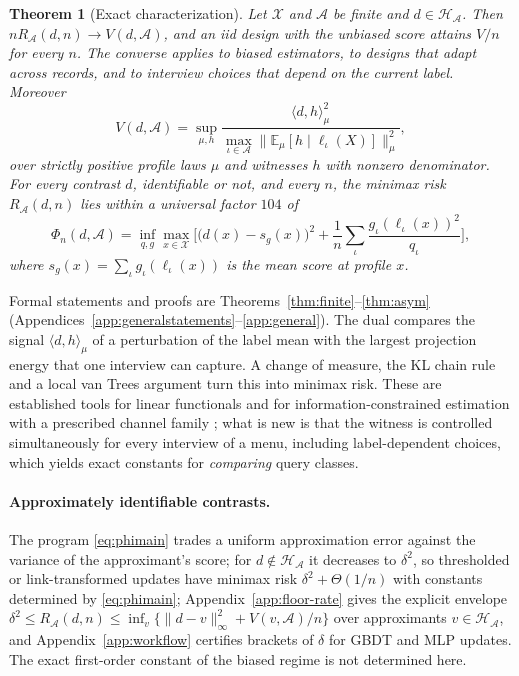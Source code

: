 \documentclass{article}
\newtheorem{theorem}{Theorem}
\newcommand{\E}{\mathbb{E}}
\newcommand{\X}{\mathcal X}
\newcommand{\A}{\mathcal A}
\newcommand{\Hh}{\mathcal H}
\begin{document}
\begin{theorem}[Exact characterization]\label{thm:char}
Let $\X$ and $\A$ be finite and $d\in\Hh_\A$. Then $nR_\A(d,n)\to V(d,\A)$, and an iid design with the unbiased score attains $V/n$ for every $n$. The converse applies to biased estimators, to designs that adapt across records, and to interview choices that depend on the current label. Moreover
\[
 V(d,\A)=\sup_{\mu,h}\frac{\langle d,h\rangle_\mu^2}{\max_{\iota\in\A}\|\E_\mu[h\mid\ell_\iota(X)]\|_\mu^2},
\]
over strictly positive profile laws $\mu$ and witnesses $h$ with nonzero denominator. For every contrast $d$, identifiable or not, and every $n$, the minimax risk $R_\A(d,n)$ lies within a universal factor $104$ of
\begin{equation}
 \Phi_n(d,\A)=\inf_{q,g}\max_{x\in\X}\Big[\big(d(x)-s_g(x)\big)^2+\frac1n\sum_\iota\frac{g_\iota(\ell_\iota(x))^2}{q_\iota}\Big],\!\!\label{eq:phimain}
\end{equation}
where $s_g(x)=\sum_\iota g_\iota(\ell_\iota(x))$ is the mean score at profile $x$.
\end{theorem}
Formal statements and proofs are Theorems~\ref{thm:finite}--\ref{thm:asym} (Appendices~\ref{app:generalstatements}--\ref{app:general}). The dual compares the signal $\langle d,h\rangle_\mu$ of a perturbation of the label mean with the largest projection energy that one interview can capture. A change of measure, the KL chain rule and a local van Trees argument turn this into minimax risk. These are established tools for linear functionals \citep{donoho1994,juditsky2009,polyanskiy2026} and for information-constrained estimation with a prescribed channel family \citep{acharya2019,barnes2020}; what is new is that the witness is controlled simultaneously for every interview of a menu, including label-dependent choices, which yields exact constants for \emph{comparing} query classes.

\paragraph{Approximately identifiable contrasts.}
The program \eqref{eq:phimain} trades a uniform approximation error against the variance of the approximant's score; for $d\notin\Hh_\A$ it decreases to $\delta^2$, so thresholded or link-transformed updates have minimax risk $\delta^2+\Theta(1/n)$ with constants determined by \eqref{eq:phimain}; Appendix~\ref{app:floor-rate} gives the explicit envelope $\delta^2\le R_\A(d,n)\le\inf_v\{\|d-v\|_\infty^2+V(v,\A)/n\}$ over approximants $v\in\Hh_\A$, and Appendix~\ref{app:workflow} certifies brackets of $\delta$ for GBDT and MLP updates. The exact first-order constant of the biased regime is not determined here.
\end{document}
